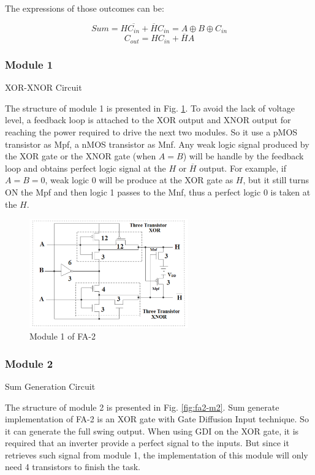 \documentclass[conference]{IEEEtran}
\begin{document}
The expressions of those outcomes can be:

\[
	Sum = H\overline{C_{in}} + \overline{H}C_{in} = A \oplus B \oplus C_{in}
\]
\[
	C_{out} = HC_{in} + \overline{H}A
\]

\subsubsection{Module 1}XOR-XNOR Circuit

The structure of module 1 is presented in Fig. \ref{fig:fa2-m1}.
To avoid the lack of voltage level, a feedback loop is attached to the XOR output and XNOR output
for reaching the power required to drive the next two modules. So it use a pMOS transistor as Mpf, a nMOS transistor as Mnf.
Any weak logic signal produced by the XOR gate or the XNOR gate (when \(A=B\))
will be handle by the feedback loop and obtains perfect logic signal at the \(H\) or $\overline{H}$ output.
For example, if \(A = B = 0\), weak logic 0 will be produce at the XOR gate as \(H\),
but it still turns ON the Mpf and then logic 1 passes to the Mnf, thus a perfect logic 0 is taken at the \(H\).

\begin{figure}[!ht]
	\centering
	\includegraphics[width=2.7in]{fa2-m1.png}
	\caption{Module 1 of FA-2}
	\label{fig:fa2-m1}
\end{figure}

\subsubsection{Module 2} Sum Generation Circuit

The structure of module 2 is presented in Fig. \ref{fig:fa2-m2}.
Sum generate implementation of FA-2 is an XOR gate with Gate Diffusion Input technique.
So it can generate the full swing output.
When using GDI on the XOR gate, it is required that an inverter provide a perfect signal to the inputs.
But since it retrieves such signal from module 1, the implementation of this module will only need 4 transistors to finish the task.
\end{document}
